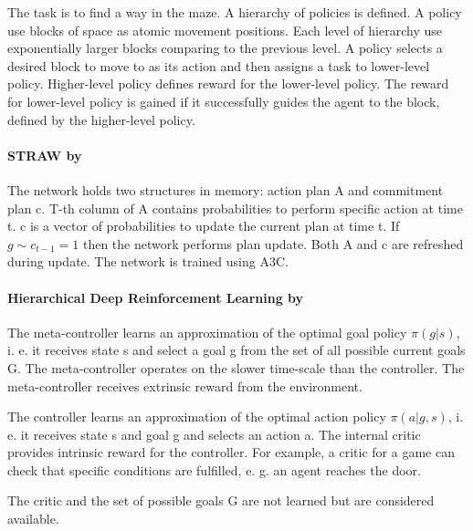 \documentclass{article}
\begin{document}
The task is to find a way in the maze. A hierarchy of policies is defined. A policy use blocks of space as atomic movement positions. Each level of hierarchy use exponentially larger blocks comparing to the previous level. A policy selects a desired block to move to as its action and then assigns a task to lower-level policy. Higher-level policy defines reward for the lower-level policy. The reward for lower-level policy is gained if it successfully guides the agent to the block, defined by the higher-level policy.


\paragraph{STRAW by~\citet{Vezhnevets2016StrategicAW}} %
\label{par:straw}

The network holds two structures in memory: action plan A and commitment plan c. T-th column of A contains probabilities to perform specific action at time t. c is a vector of probabilities to update the current plan at time t. If $g \sim c_{t-1} = 1$ then the network performs plan update. Both A and c are refreshed during update. The network is trained using A3C.


\paragraph{Hierarchical Deep Reinforcement Learning by~\citet{Kulkarni2016HierarchicalDR}} %
\label{par:hierarchical_deep_rl}

The meta-controller learns an approximation of the optimal goal policy $\pi(g|s)$, i. e. it receives state s and select a goal g from the set of all possible current goals G. The meta-controller operates on the slower time-scale than the controller. The meta-controller receives extrinsic reward from the environment.

The controller learns an approximation of the optimal action policy $\pi(a|g,s)$, i. e. it receives state s and goal g and selects an action a. The internal critic provides intrinsic reward for the controller. For example, a critic for a game can check that specific conditions are fulfilled, e. g. an agent reaches the door.

The critic and the set of possible goals G are not learned but are considered available.

\end{document}
